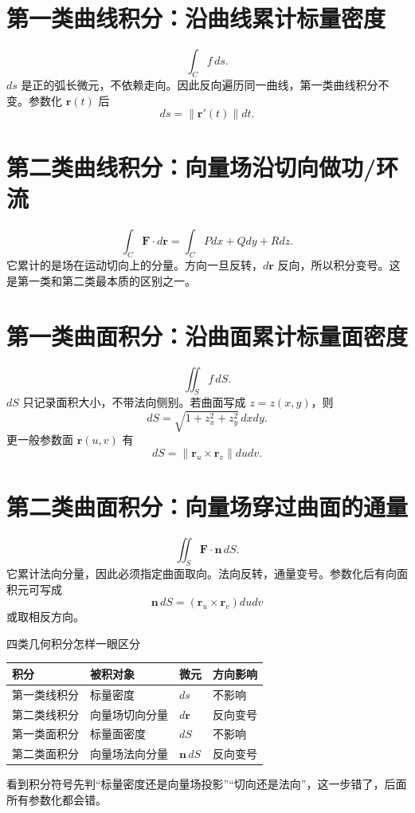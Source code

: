 \documentclass[11pt,a4paper,openany]{ctexbook}
\begin{document}
\section{第一类曲线积分：沿曲线累计标量密度}
\[
\int_C f\,ds.
\]
$ds$ 是正的弧长微元，不依赖走向。因此反向遍历同一曲线，第一类曲线积分不变。参数化 $\bm r(t)$ 后
\[
ds=\lVert\bm r'(t)\rVert dt.
\]

\section{第二类曲线积分：向量场沿切向做功/环流}
\[
\int_C \bm F\cdot d\bm r=\int_C Pdx+Qdy+Rdz.
\]
它累计的是场在运动切向上的分量。方向一旦反转，$d\bm r$ 反向，所以积分变号。这是第一类和第二类最本质的区别之一。

\section{第一类曲面积分：沿曲面累计标量面密度}
\[
\iint_S f\,dS.
\]
$dS$ 只记录面积大小，不带法向侧别。若曲面写成 $z=z(x,y)$，则
\[
dS=\sqrt{1+z_x^2+z_y^2}\,dxdy.
\]
更一般参数面 $\bm r(u,v)$ 有
\[
dS=\lVert\bm r_u\times\bm r_v\rVert dudv.
\]

\section{第二类曲面积分：向量场穿过曲面的通量}
\[
\iint_S \bm F\cdot\bm n\,dS.
\]
它累计法向分量，因此必须指定曲面取向。法向反转，通量变号。参数化后有向面积元可写成
\[
\bm n\,dS=(\bm r_u\times\bm r_v)dudv
\]
或取相反方向。

\begin{boundarybox}{四类几何积分怎样一眼区分}
\vspace{0.2em}
\begin{center}
\small
\begin{tabularx}{\linewidth}{L{2.6cm}L{3.6cm}L{2.2cm}Y}
\toprule
\textbf{积分} & \textbf{被积对象} & \textbf{微元} & \textbf{方向影响}\\
\midrule
第一类线积分 & 标量密度 & $ds$ & 不影响\\
第二类线积分 & 向量场切向分量 & $d\bm r$ & 反向变号\\
第一类面积分 & 标量面密度 & $dS$ & 不影响\\
第二类面积分 & 向量场法向分量 & $\bm n\,dS$ & 反向变号\\
\bottomrule
\end{tabularx}
\end{center}
\vspace{0.2em}
看到积分符号先判“标量密度还是向量场投影”“切向还是法向”，这一步错了，后面所有参数化都会错。
\end{boundarybox}
\end{document}
